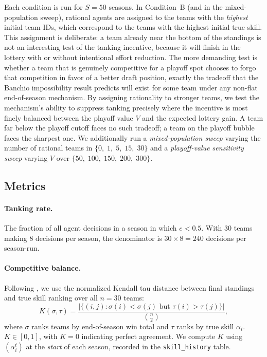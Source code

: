\documentclass{article}
\begin{document}
Each condition is run for $S = 50$ seasons.
In Condition~B (and in the mixed-population sweep), rational agents are
assigned to the teams with the \emph{highest} initial team IDs, which
correspond to the teams with the highest initial true skill.
This assignment is deliberate: a team already near the bottom of the standings
is not an interesting test of the tanking incentive, because it will finish in
the lottery with or without intentional effort reduction.
The more demanding test is whether a team that is genuinely competitive for a
playoff spot chooses to forgo that competition in favor of a better draft
position, exactly the tradeoff that the Banchio impossibility result predicts
will exist for some team under any non-flat end-of-season mechanism.
By assigning rationality to stronger teams, we test the mechanism's ability
to suppress tanking precisely where the incentive is most finely balanced
between the playoff value $V$ and the expected lottery gain.
A team far below the playoff cutoff faces no such tradeoff; a team on the
playoff bubble faces the sharpest one.
We additionally run a \emph{mixed-population sweep} varying the number of
rational teams in $\{0,\; 1,\; 5,\; 15,\; 30\}$ and a \emph{playoff-value
sensitivity sweep} varying $V$ over $\{50,\; 100,\; 150,\; 200,\; 300\}$.

\subsection{Metrics}
\label{sec:metrics}

\paragraph{Tanking rate.}
The fraction of all agent decisions in a season in which $e < 0.5$.
With 30 teams making 8 decisions per season, the denominator is
$30 \times 8 = 240$ decisions per season-run.

\paragraph{Competitive balance.}
Following \citet{kazachkov2020}, we use the normalized Kendall tau distance
between final standings and true skill ranking over all $n = 30$ teams:
\[
    K(\sigma, \tau)
    = \frac{\bigl|\{(i,j) : \sigma(i) < \sigma(j)
                  \text{ but } \tau(i) > \tau(j)\}\bigr|}{\binom{n}{2}},
\]
where $\sigma$ ranks teams by end-of-season win total and $\tau$ ranks by
true skill $\alpha_i$.
$K \in [0,1]$, with $K = 0$ indicating perfect agreement.
We compute $K$ using $(\alpha_i^t)$ at the \emph{start} of each season,
recorded in the \texttt{skill\_history} table.
\end{document}

